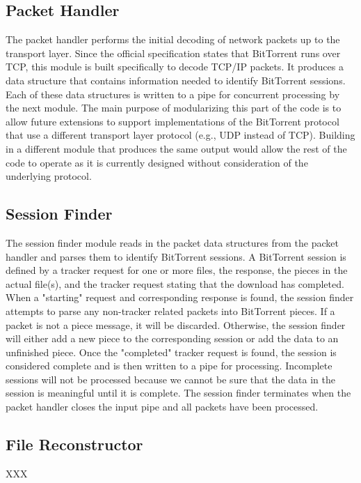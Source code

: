 \documentclass{acm_proc_article-sp}
\begin{document}
\subsection{Packet Handler}
The packet handler performs the initial decoding of network packets up to the
transport layer. Since the official specification states that BitTorrent runs
over TCP, this module is built specifically to decode TCP/IP packets. It
produces a data structure that contains information needed to identify
BitTorrent sessions. Each of these data structures is written to a pipe for
concurrent processing by the next module. The main purpose of modularizing this
part of the code is to allow future extensions to support implementations of
the BitTorrent protocol that use a different transport layer protocol
(e.g., UDP instead of TCP). Building in a different module that produces the
same output would allow the rest of the code to operate as it is currently
designed without consideration of the underlying protocol.

\subsection{Session Finder}
The session finder module reads in the packet data structures from the packet
handler and parses them to identify BitTorrent sessions. A BitTorrent session is
defined by a tracker request for one or more files, the response, the pieces in
the actual file(s), and the tracker request stating that the download has
completed. When a "starting" request and corresponding response is found, the
session finder attempts to parse any non-tracker related packets into BitTorrent
pieces. If a packet is not a piece message, it will be discarded. Otherwise, the
session finder will either add a new piece to the corresponding session or add
the data to an unfinished piece. Once the "completed" tracker request is found,
the session is considered complete and is then written to a pipe for
processing. Incomplete sessions will not be processed because we cannot be sure
that the data in the session is meaningful until it is complete. The session
finder terminates when the packet handler closes the input pipe and all packets
have been processed.

\subsection{File Reconstructor}
XXX
\end{document}
